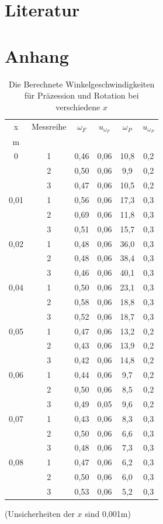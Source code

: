 \documentclass[11pt,a4paper]{article} %
\begin{document}
\section{Literatur}

\section{Anhang}

\begin{table}[h]
	\centering
	\begin{tabular*}{0.99\textwidth}{@{\extracolsep{\fill}}cccccc}
		\toprule
		x & Messreihe & $\omega_F$ & $u_{\omega_F}$ & $\omega_P$ & $u_{\omega_P}$ \\
		m &  &    \\
		\bottomrule
		0 & 1 & 0,46 & 0,06 & 10,8 & 0,2 \\
		& 2 & 0,50 & 0,06 & 9,9 & 0,2 \\
		 & 3 & 0,47 & 0,06 & 10,5 & 0,2 \\
		0,01 & 1 & 0,56 & 0,06 & 17,3 & 0,3\\
		& 2 & 0,69 & 0,06 & 11,8 & 0,3 \\
		& 3 & 0,51 & 0,06 & 15,7 & 0,3 \\
		0,02 & 1 & 0,48 & 0,06 & 36,0  &  0,3\\
		& 2 & 0,48 &0,06 & 38,4 & 0,3  \\
		& 3 & 0,46 & 0,06 & 40,1 & 0,3 \\
		0,04 & 1 & 0,50 & 0,06 & 23,1&0,3 \\
		& 2 & 0,58 &0,06&18,8&0,3 \\
		& 3 & 0,52 &0,06&18,7&0,3 \\
		0,05 & 1 & 0,47 &0,06&13,2&0,2 \\
		& 2 & 0,43&0,06&13,9&0,2 \\
		& 3 & 0,42&0,06&14,8&0,2 \\
		0,06 & 1 & 0,44 & 0,06 &9,7&0,2 \\
		& 2 & 0,50 & 0,06&8,5&0,2 \\
		& 3 & 0,49 & 0,05&9,6&0,2 \\
		0,07 & 1 & 0,43 &0,06&8,3&0,3 \\
		& 2 & 0,50&0,06&6,6&0,3 \\
		& 3 & 0,48&0,06&7,3&0,3 \\
		0,08 & 1 & 0,47 & 0,06&6,2&0,3 \\
		& 2 & 0,50 & 0,06&6,0&0,3 \\
		& 3 & 0,53&0,06&5,2&0,3 \\
		\bottomrule
	\end{tabular*}
	\caption{Die Berechnete Winkelgeschwindigkeiten für Präzession und Rotation bei verschiedene $x$}
	\label{tabelle}
\end{table}
(Unsicherheiten der $x$ sind 0,001m)
\end{document}
